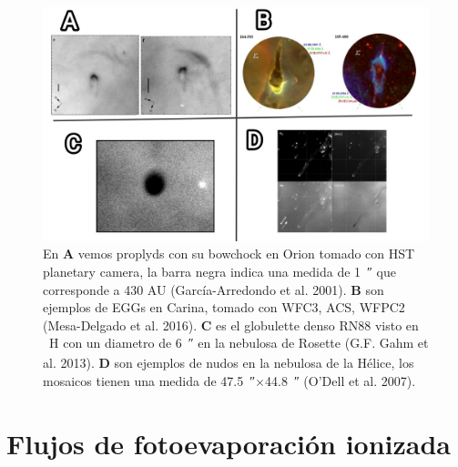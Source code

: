 \documentclass{article}
\begin{document}
\begin{figure}[h]
    \centering
    \includegraphics[width=1 \textwidth]{images Chapter 1/C1_Globulettes.jpg}
    \caption{En \textbf{A} vemos proplyds con su bowchock en Orion tomado con HST planetary camera, la barra negra indica una medida de \SI{1}{\arcsecond} que corresponde a 430 AU (García-Arredondo et al. 2001). \textbf{B} son ejemplos de EGGs en Carina, tomado con WFC3, ACS, WFPC2 (Mesa-Delgado et al. 2016). \textbf{C} es el globulette denso RN88 visto en \SI{}{H_\alpha} con un diametro de \SI{6}{\arcsecond} en la nebulosa de Rosette (G.F. Gahm et al. 2013). \textbf{D} son ejemplos de nudos en la nebulosa de la Hélice, los mosaicos tienen una medida de \SI{47.5}{\arcsecond}$\times$\SI{44.8}{\arcsecond} (O'Dell et al. 2007). }
    \label{fig:zones}
\end{figure}


\section{Flujos de fotoevaporación ionizada}
\end{document}
